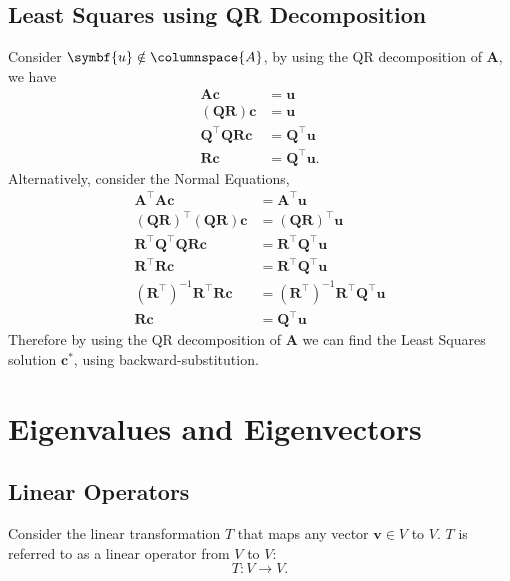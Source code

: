 \documentclass{article}
\begin{document}
\subsection{Least Squares using QR Decomposition}
Consider \(\symbf{u} \notin \columnspace{A}\), by using the QR
decomposition of \(\symbf{A}\), we have
\begin{align*}
    \symbf{A} \symbf{c}                          & = \symbf{u}                 \\
    \left( \symbf{Q} \symbf{R} \right) \symbf{c} & = \symbf{u}                 \\
    \symbf{Q}^\top \symbf{Q} \symbf{R} \symbf{c} & = \symbf{Q}^\top \symbf{u}  \\
    \symbf{R} \symbf{c}                          & = \symbf{Q}^\top \symbf{u}.
\end{align*}
Alternatively, consider the Normal Equations,
\begin{align*}
    \symbf{A}^\top \symbf{A} \symbf{c}                                                   & = \symbf{A}^\top \symbf{u}                                                   \\
    \left( \symbf{Q} \symbf{R} \right)^\top \left( \symbf{Q} \symbf{R} \right) \symbf{c} & = \left( \symbf{Q} \symbf{R} \right)^\top \symbf{u}                          \\
    \symbf{R}^\top \symbf{Q}^\top \symbf{Q} \symbf{R} \symbf{c}                          & = \symbf{R}^\top \symbf{Q}^\top \symbf{u}                                    \\
    \symbf{R}^\top \symbf{R} \symbf{c}                                                   & = \symbf{R}^\top \symbf{Q}^\top \symbf{u}                                    \\
    \left( \symbf{R}^\top \right)^{-1} \symbf{R}^\top \symbf{R} \symbf{c}                & = \left( \symbf{R}^\top \right)^{-1} \symbf{R}^\top \symbf{Q}^\top \symbf{u} \\
    \symbf{R} \symbf{c}                                                                  & = \symbf{Q}^\top \symbf{u}
\end{align*}
Therefore by using the QR decomposition of \(\symbf{A}\) we can find the Least Squares solution \(\symbf{c}^\ast\), using backward-substitution.
\section{Eigenvalues and Eigenvectors}
\subsection{Linear Operators}
Consider the linear transformation \(T\) that maps any vector
\(\symbf{v}\in V\) to \(V\). \(T\) is referred to as a linear operator
from \(V\) to \(V\):
\begin{equation*}
    T:V \to V.
\end{equation*}
\end{document}
